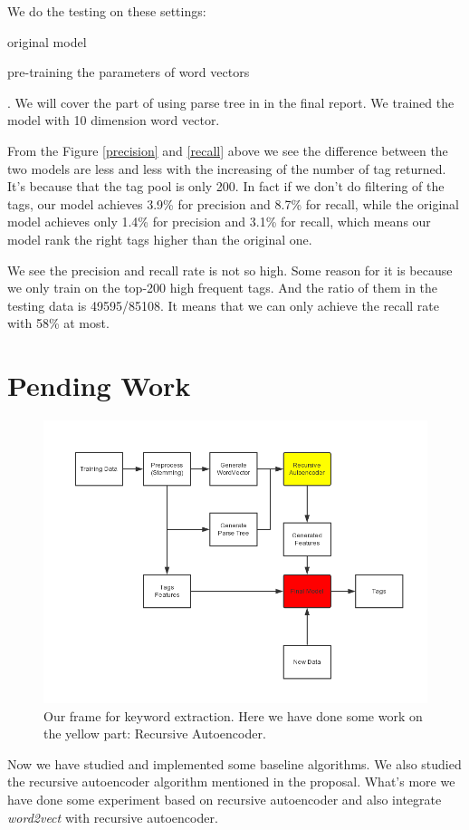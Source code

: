 \documentclass[dvips,9pt]{article}
\begin{document}
        We do the testing on these settings:\begin{inparaenum}[(i)]
            \item original model
            \item pre-training the parameters of word vectors
        \end{inparaenum}. We will cover the part of using parse tree in in the final report. We trained the model with 10 dimension word vector.
        
        From the Figure \ref{precision} and \ref{recall} above we see the difference between the two models are less and less with the increasing of the number of tag returned. It's because that the tag pool is only 200. In fact if we don't do filtering of the tags, our model achieves 3.9\% for precision and 8.7\% for recall, while the original model achieves only 1.4\% for precision and 3.1\% for recall, which means our model rank the right tags higher than the original one.
        
        We see the precision and recall rate is not so high. Some reason for it is because we only train on the top-200 high frequent tags. And the ratio of them in the testing data is 49595/85108. It means that we can only achieve the recall rate with 58\% at most.
	\section{Pending Work}
    \begin{figure}
        \includegraphics[scale=0.6]{DataFlow.png}
        \caption{Our frame for keyword extraction. Here we have done some work on the yellow part: Recursive Autoencoder.}
        \label{frame}
    \end{figure}
    Now we have studied and implemented some baseline algorithms. We also studied the recursive autoencoder algorithm mentioned in the proposal. What's more we have done some experiment based on recursive autoencoder and also integrate \emph{word2vect} with recursive autoencoder.
    
\end{document}
